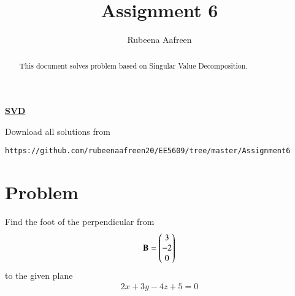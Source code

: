 \documentclass[journal,12pt,twocolumn]{IEEEtran}
\begin{document}
 \vspace{3cm}
 \title{Assignment 6}
 \author{Rubeena Aafreen}
 \maketitle
 \newpage
 \bigskip
 \renewcommand{\thetable}{\theenumi}
\vspace{1.0cm}
\vspace{2ex}
\begin{center}
{\underline{\Large \bf SVD}}
\end{center}
\begin{abstract}
This document solves problem based on Singular Value Decomposition.
\end{abstract}
\vspace{0.5cm}
%
Download all solutions from 
\begin{lstlisting}
https://github.com/rubeenaafreen20/EE5609/tree/master/Assignment6
\end{lstlisting}
%
%
\vspace{0.5mm}
\section{Problem}
Find the foot of the perpendicular from
\begin{align}
\mathbf{B}=\begin{pmatrix}3\\-2\\0\end{pmatrix}
\end{align}
to the given plane
\begin{align}
2x+3y-4z+5=0 
\end{align}
\end{document}
